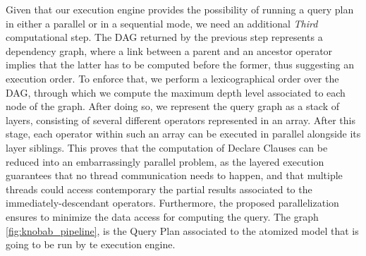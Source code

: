 Given that our execution engine provides the possibility of running a query plan in either a parallel or in a sequential mode, we need   an additional \textit{Third} computational step. The DAG returned by the previous step represents a dependency graph, where a link between a parent and an ancestor operator implies that the latter has to be computed before the former, thus suggesting an execution order. To enforce that, we perform a lexicographical order over the DAG, through which we compute the maximum depth level associated to each node of the graph. After doing so, we represent the query graph as a stack of layers, consisting of several different operators represented in an array. After this stage, each operator within such an array can be executed in parallel alongside its layer siblings. This proves that the computation of Declare Clauses can be reduced into an embarrassingly parallel problem, as the layered execution guarantees that no thread communication needs to happen, and that multiple threads could access contemporary the partial results associated to the immediately-descendant operators. Furthermore, the proposed parallelization ensures to minimize the data access for computing the query. The graph \figurename\ref{fig:knobab_pipeline}, is the Query Plan associated to the atomized model that is going to be run by te execution engine.

